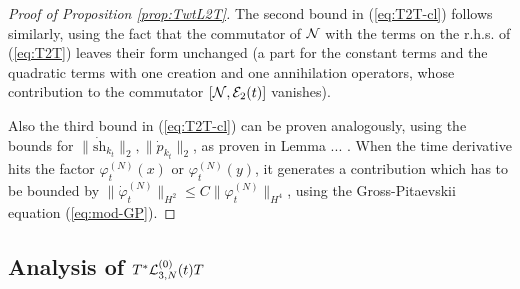 \documentclass[11pt,a4paper,DIV11]{scrartcl}	%
\newcommand{\cE}{{\cal E}}
\newcommand{\cL}{{\cal L}}
\newcommand{\cN}{{\cal N}}
\begin{document}
\begin{proof}[Proof of Proposition \ref{prop:TwtL2T}]
The second bound in (\ref{eq:T2T-cl}) follows similarly, using the fact that the commutator of $\cN$ with the terms on the r.h.s. of (\ref{eq:T2T}) leaves their form unchanged (a part for the constant terms and the quadratic terms with one creation and one annihilation operators, whose contribution to the commutator $[\cN , \cE_2 (t)]$ vanishes).  

Also the third bound in (\ref{eq:T2T-cl}) can be proven analogously, using the bounds for $\| \dot{\text{sh}}_{k_t} \|_2, \| \dot{p}_{k_t} \|_2$, as proven in Lemma ... . When the time derivative hits the factor $\varphi_t^{(N)} (x)$ or $\varphi_t^{(N)} (y)$, it generates a contribution which has to be bounded by $\| \dot\varphi_t^{(N)} \|_{H^2} \leq C \| \varphi_t^{(N)} \|_{H^4}$, using the Gross-Pitaevskii equation (\ref{eq:mod-GP}). 
\end{proof}

\subsection{Analysis of $T^* \cL^{(0)}_{3,N} (t) T$}
\end{document}

